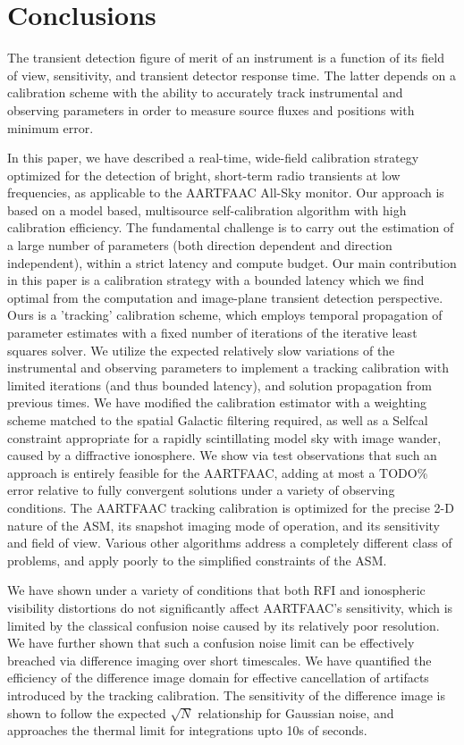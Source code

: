 \documentclass{aa}
\begin{document}
\section{Conclusions}

The transient  detection figure of merit of  an instrument is a  function of its
field of  view, sensitivity,  and transient detector  response time.  The latter
depends  on  a   calibration  scheme  with  the  ability   to  accurately  track
instrumental  and observing  parameters in  order to  measure source  fluxes and
positions with minimum error.

In this  paper, we have  described a real-time, wide-field  calibration strategy
optimized  for the  detection  of  bright, short-term  radio  transients at  low
frequencies, as  applicable to  the AARTFAAC All-Sky  monitor.  Our  approach is
based  on  a  model  based,  multisource self-calibration  algorithm  with  high
calibration efficiency. The fundamental challenge is to carry out the estimation
of  a  large  number  of  parameters (both  direction  dependent  and  direction
independent), within a strict latency  and compute budget. Our main contribution
in this  paper is a  calibration strategy with  a bounded latency which  we find
optimal   from    the   computation   and    image-plane   transient   detection
perspective.  Ours is a  'tracking' calibration  scheme, which  employs temporal
propagation  of parameter estimates  with a  fixed number  of iterations  of the
iterative  least  squares  solver.  We  utilize  the  expected  relatively  slow
variations of the instrumental and  observing parameters to implement a tracking
calibration  with limited iterations  (and thus  bounded latency),  and solution
propagation from previous times. We have modified the calibration estimator with
a weighting scheme  matched to the spatial Galactic  filtering required, as well
as a Selfcal  constraint appropriate for a rapidly  scintillating model sky with
image wander, caused by a  diffractive ionosphere. We show via test observations
that such  an approach is entirely feasible  for the AARTFAAC, adding  at most a
TODO\% error relative to fully convergent solutions under a variety of observing
conditions. The AARTFAAC  tracking calibration is optimized for  the precise 2-D
nature of the  ASM, its snapshot imaging mode of  operation, and its sensitivity
and field of view. Various other algorithms address a completely different class
of problems, and apply poorly to the simplified constraints of the ASM.

We  have shown  under a  variety  of conditions  that both  RFI and  ionospheric
visibility distortions do not significantly affect AARTFAAC's sensitivity, which
is  limited by  the  classical confusion  noise  caused by  its relatively  poor
resolution.  We  have further  shown that  such a confusion  noise limit  can be
effectively  breached via  difference  imaging over  short  timescales. We  have
quantified  the  efficiency  of   the  difference  image  domain  for  effective
cancellation  of   artifacts  introduced  by  the   tracking  calibration.   The
sensitivity of the  difference image is shown to  follow the expected $\sqrt{N}$
relationship  for   Gaussian  noise,  and  approaches  the   thermal  limit  for
integrations upto 10s of seconds.
\end{document}
